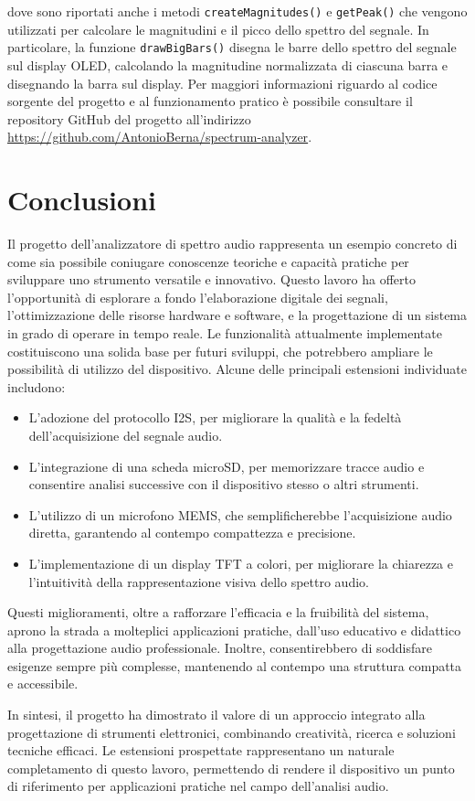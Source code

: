 \documentclass[a4paper,12pt]{report}  %
\newcommand{\lstinlinebg}[1]{\colorbox{backcolour}{\lstinline|#1|}}
\begin{document}
dove sono riportati anche i metodi \lstinlinebg{createMagnitudes()} e \lstinlinebg{getPeak()} che vengono utilizzati per calcolare le magnitudini e il picco dello spettro del segnale.
In particolare, la funzione \lstinlinebg{drawBigBars()} disegna le barre dello spettro del segnale sul display OLED, calcolando la magnitudine normalizzata di ciascuna barra e disegnando la barra sul display.
Per maggiori informazioni riguardo al codice sorgente del progetto e al funzionamento pratico è possibile consultare il repository GitHub del progetto all'indirizzo \url{https://github.com/AntonioBerna/spectrum-analyzer}.

\section{Conclusioni}\label{sec:future}
Il progetto dell'analizzatore di spettro audio rappresenta un esempio concreto di come sia possibile coniugare conoscenze teoriche e capacità pratiche per sviluppare uno strumento versatile e innovativo.
Questo lavoro ha offerto l'opportunità di esplorare a fondo l'elaborazione digitale dei segnali, l'ottimizzazione delle risorse hardware e software, e la progettazione di un sistema in grado di operare in tempo reale.
Le funzionalità attualmente implementate costituiscono una solida base per futuri sviluppi, che potrebbero ampliare le possibilità di utilizzo del dispositivo.
Alcune delle principali estensioni individuate includono:

\begin{itemize}
    \item L'adozione del protocollo I2S, per migliorare la qualità e la fedeltà dell'acquisizione del segnale audio.
    \item L'integrazione di una scheda microSD, per memorizzare tracce audio e consentire analisi successive con il dispositivo stesso o altri strumenti.
    \item L'utilizzo di un microfono MEMS, che semplificherebbe l'acquisizione audio diretta, garantendo al contempo compattezza e precisione.
    \item L'implementazione di un display TFT a colori, per migliorare la chiarezza e l'intuitività della rappresentazione visiva dello spettro audio.
\end{itemize}

Questi miglioramenti, oltre a rafforzare l'efficacia e la fruibilità del sistema, aprono la strada a molteplici applicazioni pratiche, dall'uso educativo e didattico alla progettazione audio professionale.
Inoltre, consentirebbero di soddisfare esigenze sempre più complesse, mantenendo al contempo una struttura compatta e accessibile.

In sintesi, il progetto ha dimostrato il valore di un approccio integrato alla progettazione di strumenti elettronici, combinando creatività, ricerca e soluzioni tecniche efficaci.
Le estensioni prospettate rappresentano un naturale completamento di questo lavoro, permettendo di rendere il dispositivo un punto di riferimento per applicazioni pratiche nel campo dell'analisi audio.
\end{document}
